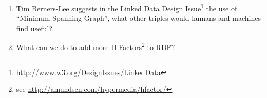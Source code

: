 \documentclass{llncs}
\begin{document}
\begin{enumerate}
\item Tim Berners-Lee suggests in the Linked Data Design
  Issue\footnote{\url{http://www.w3.org/DesignIssues/LinkedData}} the
  use of ``Minimum Spanning Graph'', what other triples would humans
  and machines find useful?

\item What can we do to add more H Factors\footnote{see
  \url{http://amundsen.com/hypermedia/hfactor/}} to RDF?

\end{enumerate}



%
%

\end{document}
